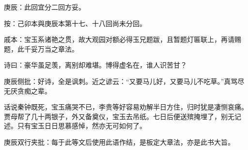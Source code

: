 
\begin{parag}

    \begin{note}庚辰：此回宜分二回方妥。\end{note}\begin{subnote}按：己卯本與庚辰本第十七、十八回尚未分回。\end{subnote}
\end{parag}


\begin{parag}


    \begin{note}戚本：宝玉系诸艳之贯，故大观园对额必得玉兄题跋，且暂题灯匾联上，再请赐题，此千妥万当之章法。\end{note}
\end{parag}

\begin{parag}

    诗曰：豪华虽足羡，离别却难堪。博得虚名在，谁人识苦甘？\begin{note}庚辰侧批：好诗，全是讽刺。近之谚云：“又要马儿好，又要马儿不吃草。”真骂尽无厌贪痴之辈。\end{note}
\end{parag}


\begin{parag}


    话说秦钟既死，宝玉痛哭不已，李贵等好容易劝解半日方住，归时犹是凄恻哀痛。贾母帮了几十两银子，外又备奠仪，宝玉去吊纸。七日后便送殡掩埋了，别无记述。只有宝玉日日思慕感悼，然亦无可如何了。\begin{note}庚辰双行夹批：每于此等文后使用此语作结，是板定大章法，亦是此书大旨。\end{note}
\end{parag}


